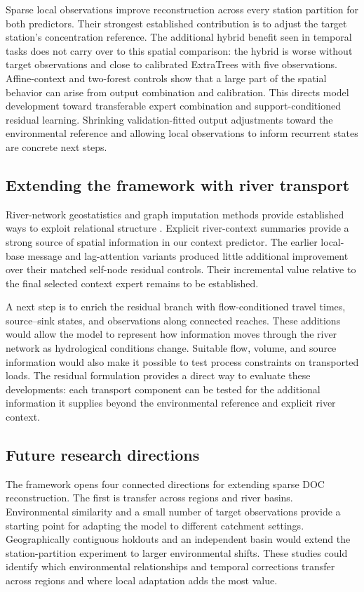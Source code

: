 \documentclass[11pt]{article}
\begin{document}
Sparse local observations improve reconstruction across every station partition for both predictors. Their strongest established contribution is to adjust the target station's concentration reference. The additional hybrid benefit seen in temporal tasks does not carry over to this spatial comparison: the hybrid is worse without target observations and close to calibrated ExtraTrees with five observations. Affine-context and two-forest controls show that a large part of the spatial behavior can arise from output combination and calibration. This directs model development toward transferable expert combination and support-conditioned residual learning. Shrinking validation-fitted output adjustments toward the environmental reference and allowing local observations to inform recurrent states are concrete next steps.

\subsection{Extending the framework with river transport}
River-network geostatistics and graph imputation methods provide established ways to exploit relational structure \citep{verhoef2006,cini2022}. Explicit river-context summaries provide a strong source of spatial information in our context predictor. The earlier local-base message and lag-attention variants produced little additional improvement over their matched self-node residual controls. Their incremental value relative to the final selected context expert remains to be established.

A next step is to enrich the residual branch with flow-conditioned travel times, source--sink states, and observations along connected reaches. These additions would allow the model to represent how information moves through the river network as hydrological conditions change. Suitable flow, volume, and source information would also make it possible to test process constraints on transported loads. The residual formulation provides a direct way to evaluate these developments: each transport component can be tested for the additional information it supplies beyond the environmental reference and explicit river context.

\subsection{Future research directions}
The framework opens four connected directions for extending sparse DOC reconstruction. The first is transfer across regions and river basins. Environmental similarity and a small number of target observations provide a starting point for adapting the model to different catchment settings. Geographically contiguous holdouts and an independent basin would extend the station-partition experiment to larger environmental shifts. These studies could identify which environmental relationships and temporal corrections transfer across regions and where local adaptation adds the most value.
\end{document}
